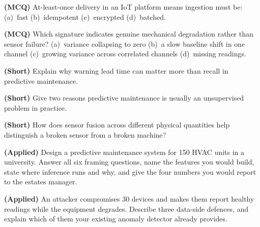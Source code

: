 \begin{reviewq}
  \item \textbf{(MCQ)} At-least-once delivery in an IoT platform means ingestion must
        be: (a)~fast (b)~idempotent (c)~encrypted (d)~batched.
  \item \textbf{(MCQ)} Which signature indicates genuine mechanical degradation
        rather than sensor failure? (a)~variance collapsing to zero (b)~a slow
        baseline shift in one channel (c)~growing variance across correlated channels
        (d)~missing readings.
  \item \textbf{(Short)} Explain why warning lead time can matter more than recall in
        predictive maintenance.
  \item \textbf{(Short)} Give two reasons predictive maintenance is usually an
        unsupervised problem in practice.
  \item \textbf{(Short)} How does sensor fusion across different physical quantities
        help distinguish a broken sensor from a broken machine?
  \item \textbf{(Applied)} Design a predictive maintenance system for 150 HVAC units
        in a university. Answer all six framing questions, name the features you would
        build, state where inference runs and why, and give the four numbers you would
        report to the estates manager.
  \item \textbf{(Applied)} An attacker compromises 30 devices and makes them report
        healthy readings while the equipment degrades. Describe three data-side
        defences, and explain which of them your existing anomaly detector already
        provides.
\end{reviewq}
